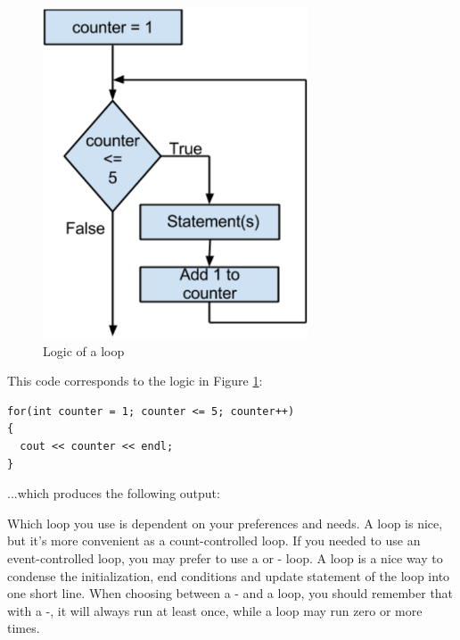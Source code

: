 \begin{figure}[tbh]
  \centering
  \includegraphics[width=0.7\textwidth]{diagrams/for_logic.pdf}
  \caption{Logic of a  loop} \label{fig-for-logic} 
\end{figure}

\noindent This code corresponds to the logic in Figure \ref{fig-for-logic}:

\noindent\begin{minipage}{\linewidth}\begin{lstlisting}
for(int counter = 1; counter <= 5; counter++)
{
  cout << counter << endl;
}
\end{lstlisting}\end{minipage}

\noindent ...which produces the following output:

\noindent{}

\noindent{}

\noindent{}

\noindent{}

\noindent{}


Which loop you use is dependent on your preferences and needs.
A  loop is nice, but it's more convenient as a count-controlled loop.
If you needed to use an event-controlled loop, you may prefer to use a  or - loop.
A  loop is a nice way to condense the initialization, end conditions and update statement of the loop into one short line.
When choosing between a - and a  loop, you should remember that with a -, it will always run at least once, while a  loop may run zero or more times.

